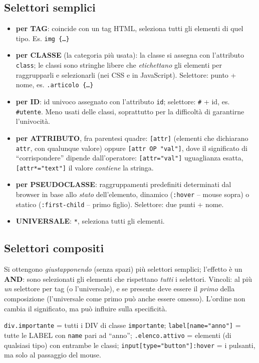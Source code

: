 \subsection{Selettori semplici}
\begin{itemize}
  \item \textbf{per TAG}: coincide con un tag HTML, seleziona tutti gli elementi di quel tipo.
        Es. \texttt{img \{\dots\}}
  \item \textbf{per CLASSE} (la categoria pi\`u usata): la classe si assegna con l'attributo
        \texttt{class}; le classi sono stringhe libere che \emph{etichettano} gli elementi
        per raggrupparli e selezionarli (nei CSS e in JavaScript). Selettore: punto + nome,
        es. \texttt{.articolo \{\dots\}}
  \item \textbf{per ID}: id univoco assegnato con l'attributo \texttt{id}; selettore:
        \texttt{\#} + id, es. \texttt{\#utente}. Meno usati delle classi, soprattutto per la
        difficolt\`a di garantirne l'univocit\`a.
  \item \textbf{per ATTRIBUTO}, fra parentesi quadre: \texttt{[attr]} (elementi che dichiarano
        \texttt{attr}, con qualunque valore) oppure \texttt{[attr OP "val"]}, dove il
        significato di ``corrispondere'' dipende dall'operatore: \texttt{[attr="val"]}
        uguaglianza esatta, \texttt{[attr*="text"]} il valore \emph{contiene} la stringa.
  \item \textbf{per PSEUDOCLASSE}: raggruppamenti predefiniti determinati dal browser in base
        allo \emph{stato} dell'elemento, dinamico (\texttt{:hover} -- mouse sopra) o statico
        (\texttt{:first-child} -- primo figlio). Selettore: due punti + nome.
  \item \textbf{UNIVERSALE}: \texttt{*}, seleziona tutti gli elementi.
\end{itemize}

\subsection{Selettori compositi}
Si ottengono \emph{giustapponendo} (senza spazi) pi\`u selettori semplici; l'effetto \`e un
\textbf{AND}: sono selezionati gli elementi che rispettano \emph{tutti} i selettori.
Vincoli: al pi\`u \emph{un} selettore per tag (o l'universale), e se presente deve essere il
\emph{primo} della composizione (l'universale come primo pu\`o anche essere omesso).
L'ordine non cambia il significato, ma pu\`o influire sulla specificit\`a.
\begin{esempio}
\texttt{div.importante} = tutti i DIV di classe \texttt{importante};
\texttt{label[name="anno"]} = tutte le LABEL con \texttt{name} pari ad ``anno'';
\texttt{.elenco.attivo} = elementi (di qualsiasi tipo) con entrambe le classi;
\texttt{input[type="button"]:hover} = i pulsanti, ma solo al passaggio del mouse.
\end{esempio}

